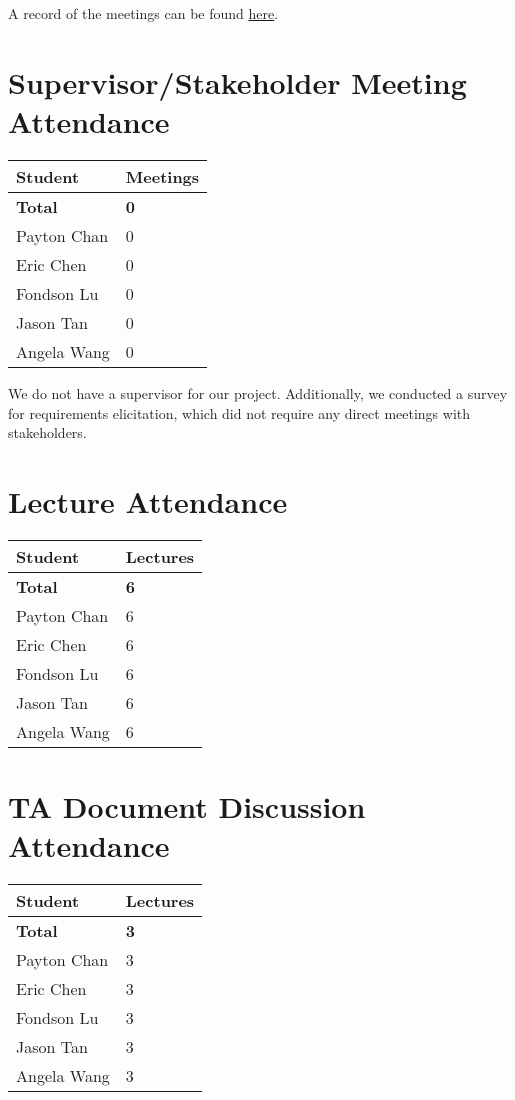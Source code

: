 \documentclass{article}
\begin{document}
A record of the meetings can be found
\href{https://github.com/PlutosCapstone/Plutos/issues?q=label%3Ameeting+is%3Aclosed}{here}.


\section{Supervisor/Stakeholder Meeting Attendance}

\begin{table}[H]
\centering
\begin{tabular}{ll}
\toprule
\textbf{Student} & \textbf{Meetings}\\
\midrule
\textbf{Total} & \textbf{0}\\
Payton Chan & 0\\
Eric Chen & 0\\
Fondson Lu & 0\\
Jason Tan & 0\\
Angela Wang & 0\\
\bottomrule
\end{tabular}
\end{table}

We do not have a supervisor for our project. Additionally, we conducted a survey
for requirements elicitation, which did not require any direct meetings with
stakeholders. 

\section{Lecture Attendance}

\begin{table}[H]
\centering
\begin{tabular}{ll}
\toprule
\textbf{Student} & \textbf{Lectures}\\
\midrule
\textbf{Total} & \textbf{6}\\
Payton Chan & 6\\
Eric Chen & 6\\
Fondson Lu & 6\\
Jason Tan & 6\\
Angela Wang & 6\\
\bottomrule
\end{tabular}
\end{table}


\section{TA Document Discussion Attendance}

\begin{table}[H]
\centering
\begin{tabular}{ll}
\toprule
\textbf{Student} & \textbf{Lectures}\\
\midrule
\textbf{Total} & \textbf{3}\\
Payton Chan & 3\\
Eric Chen & 3\\
Fondson Lu & 3\\
Jason Tan & 3\\
Angela Wang & 3\\
\bottomrule
\end{tabular}
\end{table}
\end{document}

